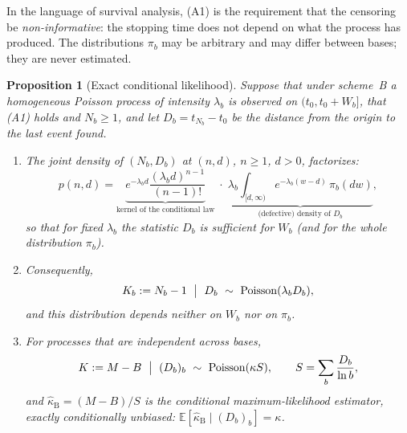 \documentclass[11pt,a4paper]{article}
\theoremstyle{plain}
\newtheorem{proposition}{Proposition}
\theoremstyle{remark}
\DeclareMathOperator{\Pois}{Poisson}
\begin{document}
\medskip
\noindent In the language of survival analysis, (A1) is the requirement that the
censoring be \emph{non-informative}: the stopping time does not depend on what
the process has produced. The distributions $\pi_b$ may be arbitrary and may
differ between bases; they are never estimated.

\begin{proposition}[Exact conditional likelihood]\label{prop:cond}
Suppose that under scheme~B a homogeneous Poisson process of intensity
$\lambda_b$ is observed on $(t_0,t_0+W_b]$, that (A1) holds and $N_b\ge1$, and
let $D_b=t_{N_b}-t_0$ be the distance from the origin to the last event found.
\begin{enumerate}
\item[\rm(i)] The joint density of $(N_b,D_b)$ at $(n,d)$, $n\ge1$, $d>0$,
factorizes:
\begin{equation}\label{eq:factor}
p(n,d)=\underbrace{e^{-\lambda_bd}\frac{(\lambda_bd)^{n-1}}{(n-1)!}}_{\text{kernel of the conditional law}}
\;\cdot\;
\underbrace{\lambda_b\int_{[d,\infty)}e^{-\lambda_b(w-d)}\,\pi_b(dw)}_{\text{(defective) density of }D_b},
\end{equation}
so that for fixed $\lambda_b$ the statistic $D_b$ is sufficient for $W_b$ (and
for the whole distribution $\pi_b$).
\item[\rm(ii)] Consequently,
\begin{equation}\label{eq:condlaw}
K_b:=N_b-1\ \bigm|\ D_b\ \sim\ \Pois(\lambda_b D_b),
\end{equation}
and this distribution depends neither on $W_b$ nor on $\pi_b$.
\item[\rm(iii)] For processes that are independent across bases,
\begin{equation}\label{eq:pivotB}
K:=M-B\ \bigm|\ (D_b)_{b}\ \sim\ \Pois(\kappa S),\qquad
S=\sum_b\frac{D_b}{\ln b},
\end{equation}
and $\hat\kappa_{\mathrm B}=(M-B)/S$ is the conditional maximum-likelihood
estimator, exactly conditionally unbiased:
$\mathbb E[\hat\kappa_{\mathrm B}\mid (D_b)_b]=\kappa$.
\end{enumerate}
\end{proposition}
\end{document}
